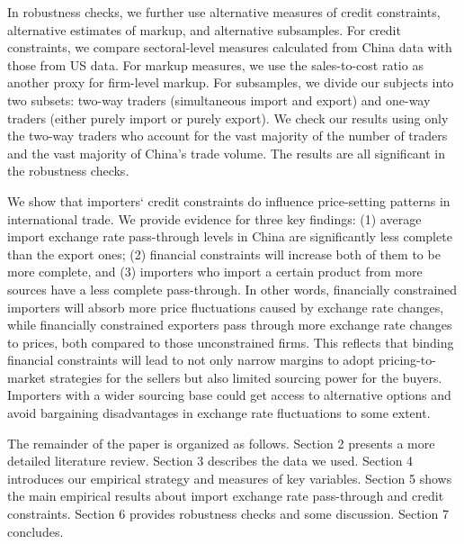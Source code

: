 In robustness checks, we further use alternative measures of credit constraints, alternative estimates of markup, and alternative subsamples. For credit constraints, we compare sectoral-level measures calculated from China data with those from US data. For markup measures, we use the sales-to-cost ratio as another proxy for firm-level markup. For subsamples, we divide our subjects into two subsets: two-way traders (simultaneous import and export) and one-way traders (either purely import or purely export). We check our results using only the two-way traders who account for the vast majority of the number of traders and the vast majority of China's trade volume. The results are all significant in the robustness checks.

We show that importers‘ credit constraints do influence price-setting patterns in international trade. We provide evidence for three key findings: (1) average import exchange rate pass-through levels in China are significantly less complete than the export ones; (2) financial constraints will increase both of them to be more complete, and (3) importers who import a certain product from more sources have a less complete pass-through. In other words, financially constrained importers will absorb more price fluctuations caused by exchange rate changes, while financially constrained exporters pass through more exchange rate changes to prices, both compared to those unconstrained firms. This reflects that binding financial constraints will lead to not only narrow margins to adopt pricing-to-market strategies for the sellers but also limited sourcing power for the buyers. Importers with a wider sourcing base could get access to alternative options and avoid bargaining disadvantages in exchange rate fluctuations to some extent.

The remainder of the paper is organized as follows. Section 2 presents a more detailed literature review. Section 3 describes the data we used. Section 4 introduces our empirical strategy and measures of key variables. Section 5 shows the main empirical results about import exchange rate pass-through and credit constraints. Section 6 provides robustness checks and some discussion. Section 7 concludes.

\newpage
